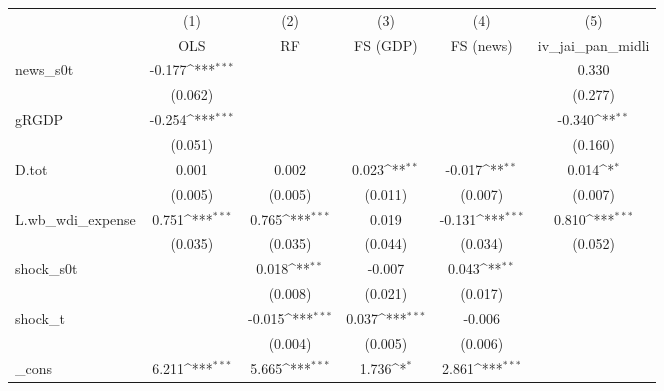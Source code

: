 {
\def\sym#1{\ifmmode^{#1}\else\(^{#1}\)\fi}
\begin{tabular}{l*{5}{c}}
\toprule
            &\multicolumn{1}{c}{(1)}&\multicolumn{1}{c}{(2)}&\multicolumn{1}{c}{(3)}&\multicolumn{1}{c}{(4)}&\multicolumn{1}{c}{(5)}\\
            &\multicolumn{1}{c}{OLS}&\multicolumn{1}{c}{RF}&\multicolumn{1}{c}{FS (GDP)}&\multicolumn{1}{c}{FS (news)}&\multicolumn{1}{c}{iv\_jai\_pan\_midli}\\
\midrule
news\_s0t    &      -0.177\sym{***}&                     &                     &                     &       0.330         \\
            &     (0.062)         &                     &                     &                     &     (0.277)         \\
\addlinespace
gRGDP       &      -0.254\sym{***}&                     &                     &                     &      -0.340\sym{**} \\
            &     (0.051)         &                     &                     &                     &     (0.160)         \\
\addlinespace
D.tot       &       0.001         &       0.002         &       0.023\sym{**} &      -0.017\sym{**} &       0.014\sym{*}  \\
            &     (0.005)         &     (0.005)         &     (0.011)         &     (0.007)         &     (0.007)         \\
\addlinespace
L.wb\_wdi\_expense&       0.751\sym{***}&       0.765\sym{***}&       0.019         &      -0.131\sym{***}&       0.810\sym{***}\\
            &     (0.035)         &     (0.035)         &     (0.044)         &     (0.034)         &     (0.052)         \\
\addlinespace
shock\_s0t   &                     &       0.018\sym{**} &      -0.007         &       0.043\sym{**} &                     \\
            &                     &     (0.008)         &     (0.021)         &     (0.017)         &                     \\
\addlinespace
shock\_t     &                     &      -0.015\sym{***}&       0.037\sym{***}&      -0.006         &                     \\
            &                     &     (0.004)         &     (0.005)         &     (0.006)         &                     \\
\addlinespace
\_cons      &       6.211\sym{***}&       5.665\sym{***}&       1.736\sym{*}  &       2.861\sym{***}&                     \\

\end{tabular}}
